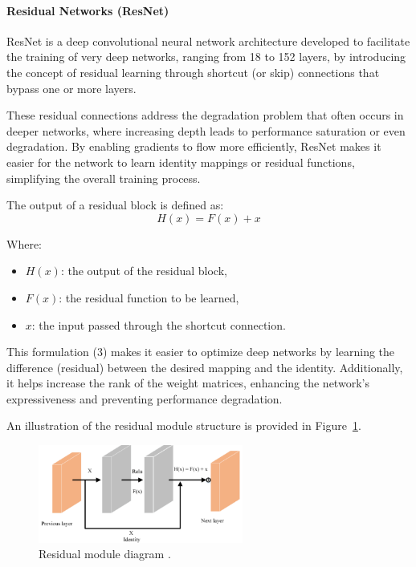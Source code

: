 \paragraph{Residual Networks (ResNet)}
ResNet is a deep convolutional neural network architecture developed to facilitate the training of very deep networks, ranging from 18 to 152 layers, by introducing the concept of residual learning through shortcut (or skip) connections that bypass one or more layers.

These residual connections address the degradation problem that often occurs in deeper networks, where increasing depth leads to performance saturation or even degradation. By enabling gradients to flow more efficiently, ResNet makes it easier for the network to learn identity mappings or residual functions, simplifying the overall training process.

The output of a residual block is defined as:
\begin{equation}
    H(x) = F(x) + x  \tag{3}
\end{equation}

Where:
\begin{itemize}
    \item $H(x)$: the output of the residual block,
    \item $F(x)$: the residual function to be learned,
    \item $x$: the input passed through the shortcut connection.
\end{itemize}

This formulation (3) makes it easier to optimize deep networks by learning the difference (residual) between the desired mapping and the identity. Additionally, it helps increase the rank of the weight matrices, enhancing the network’s expressiveness and preventing performance degradation.

An illustration of the residual module structure is provided in Figure~\ref{fig:figure11}.


\begin{figure}[H] %
    \centering
    \includegraphics[width=0.6\textwidth]{chapters/chapter1/images/Figure11.png}
    \caption{Residual module diagram \parencite{fang2023lightweight}.}
    \label{fig:figure11}
\end{figure}

